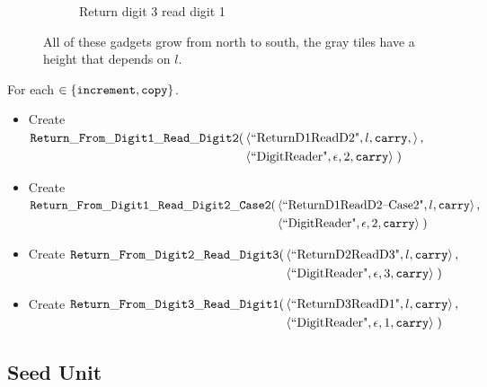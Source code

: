 \begin{figure}[H]
\begin{subfigure}[t]{0.2\textwidth}
                \caption{\label{fig:return_paths/return_digit1_read_digit2_general} Return digit 3 read digit 1}
            \end{subfigure}%
            \caption{\label{fig:return_path_same_row} All of these gadgets grow from north to south, the gray tiles have a height that
            depends on $l$.}
        \end{figure}

        \noindent For each {\inc} $\in \{ {\tt increment, copy } \}$.


        \begin{itemize}
            \item Create
            $\begin{aligned}[t]
                {\tt Return\_From\_Digit1\_Read\_Digit2}(& \left \langle \text{``ReturnD1ReadD2"}, l, {\tt carry},      \right\rangle, \\
                                        & \left \langle \text{``DigitReader"}, \epsilon, 2, {\tt carry} \right\rangle \;)
            \end{aligned}$

            \item Create
            $\begin{aligned}[t]
                {\tt Return\_From\_Digit1\_Read\_Digit2\_Case2}(& \left \langle \text{``ReturnD1ReadD2--Case2"}, l, {\tt carry} \right\rangle, \\
                                               & \left \langle \text{``DigitReader"}, \epsilon, 2, {\tt carry} \right\rangle \;)
            \end{aligned}$

            \item Create
            $\begin{aligned}[t]
                {\tt Return\_From\_Digit2\_Read\_Digit3}(& \left \langle \text{``ReturnD2ReadD3"}, l, {\tt carry}        \right\rangle, \\
                                          & \left \langle \text{``DigitReader"}, \epsilon, 3, {\tt carry} \right\rangle \;)
            \end{aligned}$

            \item Create
            $\begin{aligned}[t]
                 {\tt Return\_From\_Digit3\_Read\_Digit1}(& \left \langle \text{``ReturnD3ReadD1"}, l, {\tt carry}       \right \rangle, \\
                                           & \left \langle \text{``DigitReader"}, \epsilon, 1, {\tt carry} \right \rangle \;)
            \end{aligned}$

        \end{itemize}

\subsection{Seed Unit}

